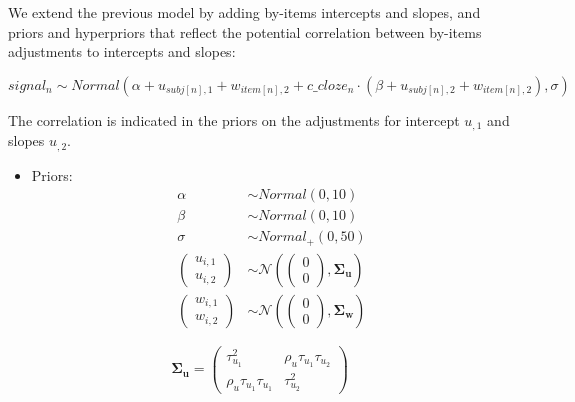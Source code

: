 \documentclass[12pt,]{krantz}
\providecommand{\tightlist}{%
  \setlength{\itemsep}{0pt}\setlength{\parskip}{0pt}}
\theoremstyle{definition}
\theoremstyle{definition}
\theoremstyle{definition}
\theoremstyle{remark}
\begin{document}
We extend the previous model by adding by-items intercepts and slopes, and priors and hyperpriors that reflect the potential correlation between by-items adjustments to intercepts and slopes:

\begin{equation}
  signal_n \sim Normal(\alpha + u_{subj[n], 1} + w_{item[n], 2} + c\_cloze_n \cdot  (\beta + u_{subj[n],2} + w_{item[n], 2}),\sigma)
\end{equation}

The correlation is indicated in the priors on the adjustments for intercept \(u_{,1}\) and slopes \(u_{,2}\).

\begin{itemize}
\tightlist
\item
  Priors:
  \begin{equation}
   \begin{aligned} 
   \alpha & \sim Normal(0,10) \\
   \beta  & \sim Normal(0,10) \\
    \sigma  &\sim Normal_+(0, 50)\\
    {\begin{pmatrix}
    u_{i,1} \\
    u_{i,2}
    \end{pmatrix}}
   &\sim {\mathcal {N}}
    \left(
   {\begin{pmatrix} 
    0\\
    0
   \end{pmatrix}}
   ,\boldsymbol{\Sigma_u} \right) \\
     {\begin{pmatrix}
    w_{i,1} \\
    w_{i,2}
    \end{pmatrix}}
   &\sim {\mathcal {N}}
    \left(
   {\begin{pmatrix} 
    0\\
    0
   \end{pmatrix}}
   ,\boldsymbol{\Sigma_w} \right)
   \end{aligned}
   \end{equation}
\end{itemize}

\begin{equation}
\boldsymbol{\Sigma_u} = 
{\begin{pmatrix} 
\tau_{u_1}^2 & \rho_u \tau_{u_1} \tau_{u_2} \\ 
\rho_u \tau_{u_1} \tau_{u_1} & \tau_{u_2}^2
\end{pmatrix}}
\end{equation}
\end{document}
